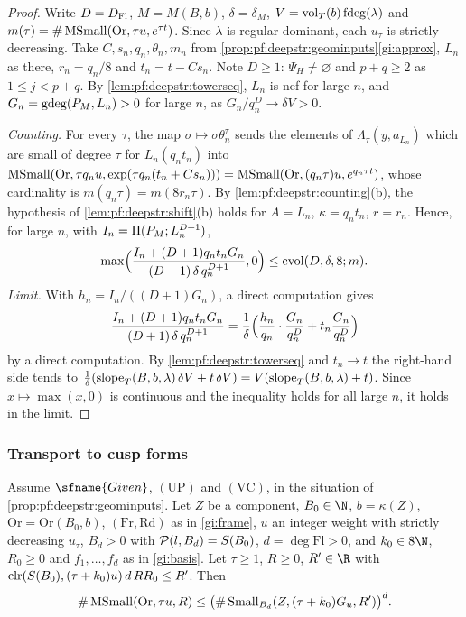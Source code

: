 \begin{proof}
Write $D=D_{\mathrm{Fl}}$, $M=M(B,b)$, $\delta=\delta_M$, $V=\operatorname{vol}_T(b)\operatorname{fdeg}(\lambda)$ and
$m(\tau)=\#\operatorname{MSmall}(\mathrm{Or},\tau u,e^{\tau t})$. Since $\lambda$ is regular dominant, each $u_\tau$ is strictly
decreasing. Take $C,s_n,q_n,\theta_n,m_n$ from \cref{prop:pf:deepstr:geominputs}\ref{gi:approx}, $L_n$ as there, $r_n=q_n/8$
and $t_n=t-Cs_n$. Note $D\ge1$: $\Psi_H\ne\varnothing$ and $p+q\ge2$ as $1\le j<p+q$. By \cref{lem:pf:deepstr:towerseq},
$L_n$ is nef for large $n$, and $G_n=\operatorname{gdeg}(P_M,L_n)>0$ for large $n$, as $G_n/q_n^D\to\delta V>0$.

\emph{Counting.} For every $\tau$, the map $\sigma\mapsto\sigma\theta_n^\tau$ sends the elements of $\Lambda_\tau(y,a_{L_n})$
which are small of degree $\tau$ for $L_n(q_nt_n)$ into $\operatorname{MSmall}(\mathrm{Or},\tau q_nu,\exp(\tau q_n(t_n+Cs_n)))
=\operatorname{MSmall}(\mathrm{Or},(q_n\tau)u,e^{q_n\tau t})$, whose cardinality is $m(q_n\tau)=m(8r_n\tau)$. By
\cref{lem:pf:deepstr:counting}(b), the hypothesis of \cref{lem:pf:deepstr:shift}(b) holds for $A=L_n$,
$\kappa=q_nt_n$, $r=r_n$. Hence, for large $n$, with $I_n=\mathrm{II}(P_M;L_n^{D+1})$,
\[
\max\Bigl(\frac{I_n+(D+1)q_nt_nG_n}{(D+1)\,\delta\,q_n^{D+1}},0\Bigr)\le\operatorname{cvol}(D,\delta,8;m).
\]
\emph{Limit.} With $h_n=I_n/((D+1)G_n)$, a direct computation gives
\[
\frac{I_n+(D+1)q_nt_nG_n}{(D+1)\,\delta\,q_n^{D+1}}=\frac1\delta\Bigl(\frac{h_n}{q_n}\cdot\frac{G_n}{q_n^{D}}
+t_n\frac{G_n}{q_n^{D}}\Bigr)
\]
by a direct computation. By \cref{lem:pf:deepstr:towerseq} and $t_n\to t$ the
right-hand side tends to $\frac1\delta(\operatorname{slope}_T(B,b,\lambda)\,\delta V+t\,\delta V)=V(\operatorname{slope}_T(B,b,\lambda)+t)$.
Since $x\mapsto\max(x,0)$ is continuous and the inequality holds for all large $n$, it holds in the limit.
\end{proof}

\subsubsection*{Transport to cusp forms}

\begin{proposition}\label{prop:pf:deepstr:transport}
Assume $\sfname{Given}$, $\mathrm{(UP)}$ and $\mathrm{(VC)}$, in the situation of
\cref{prop:pf:deepstr:geominputs}. Let $Z$ be a component, $B_0\in\N$, $b=\kappa(Z)$, $\mathrm{Or}=\mathrm{Or}(B_0,b)$,
$(\mathrm{Fr},\mathrm{Rd})$ as in
\ref{gi:frame}, $u$ an integer weight with strictly decreasing $u_\tau$, $B_d>0$ with
$\mathcal{P}(l,B_d)=S(B_0)$, $d=\deg\mathrm{Fl}>0$, and $k_0\in8\N$, $R_0\ge0$ and $f_1,\dots,f_d$ as in
\ref{gi:basis}. Let
$\tau\ge1$, $R\ge0$, $R'\in\R$ with $\operatorname{clr}(S(B_0),(\tau+k_0)u)\,d\,RR_0\le R'$. Then
\[
\#\operatorname{MSmall}(\mathrm{Or},\tau u,R)\le\bigl(\#\operatorname{Small}_{B_d}(Z,(\tau+k_0)G_u,R')\bigr)^d.
\]
\end{proposition}

